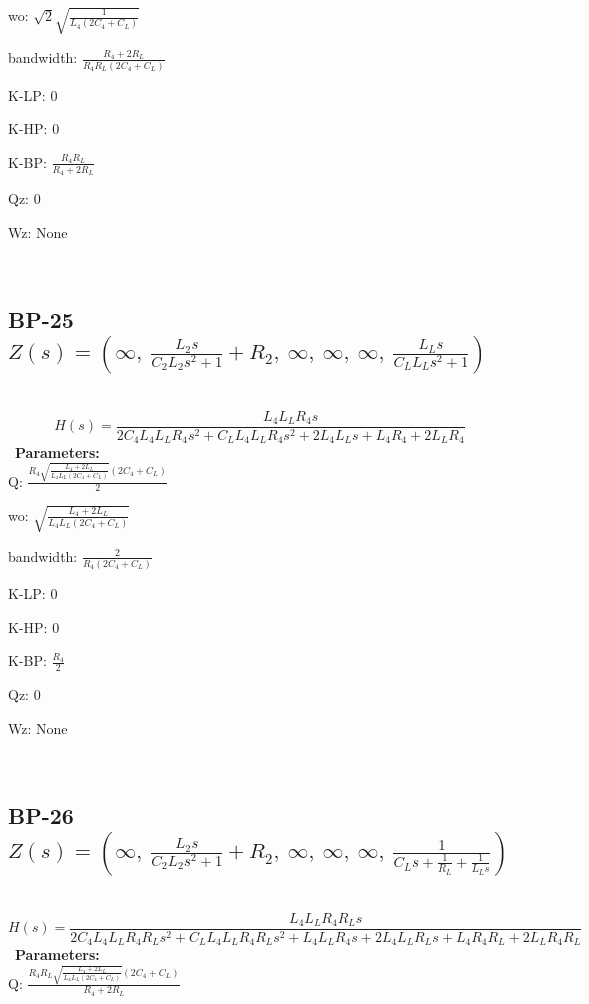 \documentclass{article}
\begin{document}
wo: $\sqrt{2} \sqrt{\frac{1}{L_{4} \left(2 C_{4} + C_{L}\right)}}$\ 

bandwidth: $\frac{R_{4} + 2 R_{L}}{R_{4} R_{L} \left(2 C_{4} + C_{L}\right)}$\ 

K-LP: $0$\ 

K-HP: $0$\ 

K-BP: $\frac{R_{4} R_{L}}{R_{4} + 2 R_{L}}$\ 

Qz: $0$\ 

Wz: $\text{None}$\ 

\ 

\subsection{BP-25 $Z(s) = \left( \infty, \  \frac{L_{2} s}{C_{2} L_{2} s^{2} + 1} + R_{2}, \  \infty, \  \infty, \  \infty, \  \frac{L_{L} s}{C_{L} L_{L} s^{2} + 1}\right)$ } \ 
\textbf{\[H(s) = \frac{L_{4} L_{L} R_{4} s}{2 C_{4} L_{4} L_{L} R_{4} s^{2} + C_{L} L_{4} L_{L} R_{4} s^{2} + 2 L_{4} L_{L} s + L_{4} R_{4} + 2 L_{L} R_{4}}\] } \ 
\textbf{Parameters:}\\ 

Q: $\frac{R_{4} \sqrt{\frac{L_{4} + 2 L_{L}}{L_{4} L_{L} \left(2 C_{4} + C_{L}\right)}} \left(2 C_{4} + C_{L}\right)}{2}$\ 

wo: $\sqrt{\frac{L_{4} + 2 L_{L}}{L_{4} L_{L} \left(2 C_{4} + C_{L}\right)}}$\ 

bandwidth: $\frac{2}{R_{4} \left(2 C_{4} + C_{L}\right)}$\ 

K-LP: $0$\ 

K-HP: $0$\ 

K-BP: $\frac{R_{4}}{2}$\ 

Qz: $0$\ 

Wz: $\text{None}$\ 

\ 

\subsection{BP-26 $Z(s) = \left( \infty, \  \frac{L_{2} s}{C_{2} L_{2} s^{2} + 1} + R_{2}, \  \infty, \  \infty, \  \infty, \  \frac{1}{C_{L} s + \frac{1}{R_{L}} + \frac{1}{L_{L} s}}\right)$ } \ 
\textbf{\[H(s) = \frac{L_{4} L_{L} R_{4} R_{L} s}{2 C_{4} L_{4} L_{L} R_{4} R_{L} s^{2} + C_{L} L_{4} L_{L} R_{4} R_{L} s^{2} + L_{4} L_{L} R_{4} s + 2 L_{4} L_{L} R_{L} s + L_{4} R_{4} R_{L} + 2 L_{L} R_{4} R_{L}}\] } \ 
\textbf{Parameters:}\\ 

Q: $\frac{R_{4} R_{L} \sqrt{\frac{L_{4} + 2 L_{L}}{L_{4} L_{L} \left(2 C_{4} + C_{L}\right)}} \left(2 C_{4} + C_{L}\right)}{R_{4} + 2 R_{L}}$\ 
\end{document}
